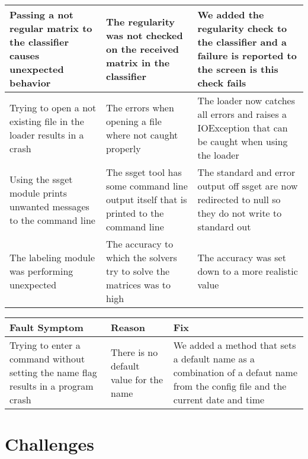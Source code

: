 \documentclass[parskip=full]{scrartcl}
\begin{document}
\begin{tabular}{|p{4.5cm}|p{4.5cm}|p{4.5cm}|}
\hline

Passing a not regular matrix to the classifier causes unexpected behavior &
The regularity was not checked on the received matrix in the classifier &
We added the regularity check to the classifier and a failure is reported to the screen is this check fails \\

\hline

Trying to open a not existing file in the loader results in a crash &
The errors when opening a file where not caught properly &
The loader now catches all errors and raises a IOException that can be caught when using the loader \\

\hline

Using the \gls{ssget} module prints unwanted messages to the command line &
The \gls{ssget} tool has some command line output itself that is printed to the command line &
The standard and error output off \gls{ssget} are now redirected to null so they do not write to standard out \\

\hline

The labeling module was performing unexpected &
The accuracy to which the solvers try to solve the matrices was to high &
The accuracy was set down to a more realistic value \\

\hline

\end{tabular}

\begin{tabular}{|p{4.5cm}|p{4.5cm}|p{4.5cm}|}

\hline

 Fault Symptom  & Reason & Fix  \\

\hline

Trying to enter a command without setting the name flag results in a program crash &
There is no default value for the name &
We added a method that sets a default name as a combination of a defaut name from the config file and the current date and time \\

\hline

\end{tabular}

\newpage

\section{Challenges}
\end{document}
